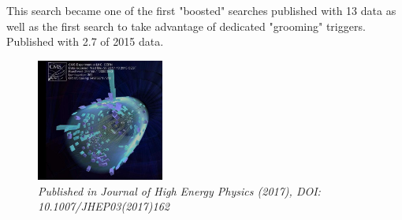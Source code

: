 \begin{singlespace}
\begin{centering}
{\newline
\newline
This search became one of the first "boosted" searches published with 13 \TeV data as well as the first search to take advantage of dedicated "grooming" triggers. Published with 2.7 \fbinv of 2015 data.
}
\begin{figure}[b!] 
    \centering
    \includegraphics[height=4cm]{figures/analysis/search1/misc/first_coll.png}
    \vspace*{10mm}
    \caption*{\footnotesize{\textit{Published in Journal of High Energy Physics (2017), DOI: 10.1007/JHEP03(2017)162}}}
\end{figure}
\end{centering}
\end{singlespace}
\clearpage

\clearpage

